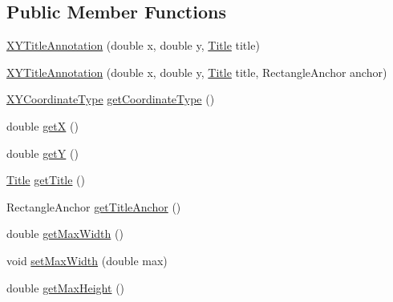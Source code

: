 \subsection*{Public Member Functions}
\begin{DoxyCompactItemize}
\item 
\mbox{\hyperlink{classorg_1_1jfree_1_1chart_1_1annotations_1_1_x_y_title_annotation_acc62d8c5dce0c03865845f8c751b15e2}{X\+Y\+Title\+Annotation}} (double x, double y, \mbox{\hyperlink{classorg_1_1jfree_1_1chart_1_1title_1_1_title}{Title}} title)
\item 
\mbox{\hyperlink{classorg_1_1jfree_1_1chart_1_1annotations_1_1_x_y_title_annotation_a505277d9ca4369b4fd8729a841c19f44}{X\+Y\+Title\+Annotation}} (double x, double y, \mbox{\hyperlink{classorg_1_1jfree_1_1chart_1_1title_1_1_title}{Title}} title, Rectangle\+Anchor anchor)
\item 
\mbox{\hyperlink{classorg_1_1jfree_1_1chart_1_1util_1_1_x_y_coordinate_type}{X\+Y\+Coordinate\+Type}} \mbox{\hyperlink{classorg_1_1jfree_1_1chart_1_1annotations_1_1_x_y_title_annotation_a5fad823f57572e221b9d00d62b347e35}{get\+Coordinate\+Type}} ()
\item 
double \mbox{\hyperlink{classorg_1_1jfree_1_1chart_1_1annotations_1_1_x_y_title_annotation_af5b474578edbc7855cbaf8777fba800d}{getX}} ()
\item 
double \mbox{\hyperlink{classorg_1_1jfree_1_1chart_1_1annotations_1_1_x_y_title_annotation_adfa87aa998b7fe2da4705ff978433975}{getY}} ()
\item 
\mbox{\hyperlink{classorg_1_1jfree_1_1chart_1_1title_1_1_title}{Title}} \mbox{\hyperlink{classorg_1_1jfree_1_1chart_1_1annotations_1_1_x_y_title_annotation_a5d85ceebbcb0177cc5c36c174053a868}{get\+Title}} ()
\item 
Rectangle\+Anchor \mbox{\hyperlink{classorg_1_1jfree_1_1chart_1_1annotations_1_1_x_y_title_annotation_a0b273fdba48923800de0c14b403f218f}{get\+Title\+Anchor}} ()
\item 
double \mbox{\hyperlink{classorg_1_1jfree_1_1chart_1_1annotations_1_1_x_y_title_annotation_aa327fe37cbbeee1d38c3bb28810e687d}{get\+Max\+Width}} ()
\item 
void \mbox{\hyperlink{classorg_1_1jfree_1_1chart_1_1annotations_1_1_x_y_title_annotation_ac7d8116f989fd907cbacea9df2210d7a}{set\+Max\+Width}} (double max)
\item 
double \mbox{\hyperlink{classorg_1_1jfree_1_1chart_1_1annotations_1_1_x_y_title_annotation_a5f2c3c80f7431d495014d25280b536f0}{get\+Max\+Height}} ()
\item 

\end{DoxyCompactItemize}
